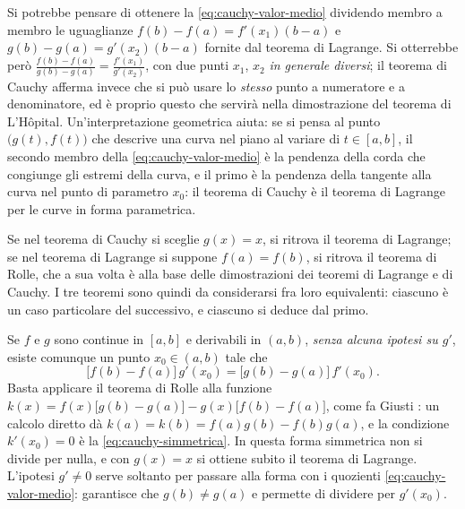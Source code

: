 \begin{attenzione}
Si potrebbe pensare di ottenere la \eqref{eq:cauchy-valor-medio} dividendo membro a membro le
uguaglianze $f(b)-f(a)=f'(x_{1})(b-a)$ e $g(b)-g(a)=g'(x_{2})(b-a)$ fornite dal teorema di
Lagrange. Si otterrebbe però $\frac{f(b)-f(a)}{g(b)-g(a)}=\frac{f'(x_{1})}{g'(x_{2})}$, con
due punti $x_{1}$, $x_{2}$ \emph{in generale diversi}; il teorema di Cauchy afferma
invece che si può usare lo \emph{stesso} punto a numeratore e a denominatore, ed è
proprio questo che servirà nella dimostrazione del teorema di L'Hôpital. Un'interpretazione
geometrica aiuta: se si pensa al punto $\bigl(g(t),f(t)\bigr)$ che descrive una curva nel
piano al variare di $t\in[a,b]$, il secondo membro della \eqref{eq:cauchy-valor-medio} è la pendenza
della corda che congiunge gli estremi della curva, e il primo è la pendenza della
tangente alla curva nel punto di parametro $x_{0}$: il teorema di Cauchy è il teorema di
Lagrange per le curve in forma parametrica.
\end{attenzione}

Se nel teorema di Cauchy si sceglie $g(x)=x$, si ritrova il teorema di Lagrange; se nel
teorema di Lagrange si suppone $f(a)=f(b)$, si ritrova il teorema di Rolle, che a sua
volta è alla base delle dimostrazioni dei teoremi di Lagrange e di Cauchy. I tre teoremi
sono quindi da considerarsi fra loro equivalenti: ciascuno è un caso particolare del
successivo, e ciascuno si deduce dal primo.

\begin{osservazione}\label{oss:cauchy-simmetrica}
Se $f$ e $g$ sono continue in $[a,b]$ e derivabili in $(a,b)$, \emph{senza alcuna
ipotesi su $g'$}, esiste comunque un punto $x_{0}\in(a,b)$ tale che
\begin{equation}\label{eq:cauchy-simmetrica}
  \bigl[f(b)-f(a)\bigr]\,g'(x_{0})=\bigl[g(b)-g(a)\bigr]\,f'(x_{0}) .
\end{equation}
Basta applicare il teorema di Rolle alla funzione
$k(x)=f(x)\bigl[g(b)-g(a)\bigr]-g(x)\bigl[f(b)-f(a)\bigr]$, come fa Giusti
\cite{giusti}: un calcolo diretto dà $k(a)=k(b)=f(a)g(b)-f(b)g(a)$, e la condizione
$k'(x_{0})=0$ è la \eqref{eq:cauchy-simmetrica}. In questa forma simmetrica non si divide
per nulla, e con $g(x)=x$ si ottiene subito il teorema di Lagrange. L'ipotesi $g'\neq0$
serve soltanto per passare alla forma con i quozienti \eqref{eq:cauchy-valor-medio}:
garantisce che $g(b)\neq g(a)$ e permette di dividere per $g'(x_{0})$.
\end{osservazione}

